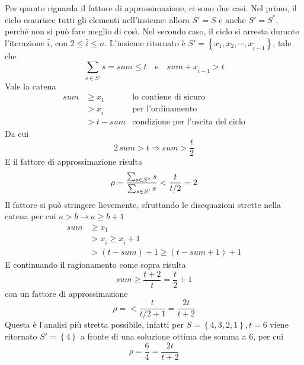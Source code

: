 Per quanto riguarda il fattore di approssimazione, ci sono due casi.
Nel primo, il ciclo esaurisce tutti gli elementi nell'insieme: allora $S' = S$ e anche $S' = S^*$, perché non si può fare meglio di così.
Nel secondo caso, il ciclo si arresta durante l'iterazione $
\bar{i}
$, con $
2 \leq \bar{i} \leq n
$. L'insieme ritornato è $
S' = \left\{ x_1, x_2, \cdots,
x_{\bar{i}-1}
\right\}
$, tale che
\begin{equation*}
    \sum_{s \in S'} s
    =
    sum
    \leq t
    \quad
    \text{e}
    \quad
    sum + 
    x_{\bar{i}-1}
    > t
\end{equation*}
Vale la catena
\begin{align*}
    sum
    &
    \geq
    x_1
    &
    \text{lo contiene di sicuro}
    \\
    &
    >
    x_{\bar{i}}
    &
    \text{per l'ordinamento}
    \\
    &
    >
    t - sum
    &
    \text{condizione per l'uscita del ciclo}
\end{align*}
Da cui
$$
2 \, sum > t
\Rightarrow
sum > \frac{t}{2}
$$
E il fattore di approssimazione risulta
\begin{equation*}
    \rho = 
    \frac{
        \sum_{s \in S^*} s
    }{
        \sum_{s \in S'} s
    }
    <
    \frac{t}{t/2}
    = 2
\end{equation*}
Il fattore si può stringere lievemente, sfruttando le disequazioni strette nella catena per cui $
a>b \to a \geq b + 1
$
\begin{align*}
    sum
    &
    \geq
    x_1
    \\
    &
    >
    x_{\bar{i}}
    \geq
    x_{\bar{i}} + 1
    \\
    &
    >
    (t - sum) + 1
    \geq 
    (t - sum + 1) + 1
\end{align*}
E continuando il ragionamento come sopra risulta 
\begin{equation*}
    sum \geq \frac{t+2}{t}
    = \frac{t}{2} + 1
\end{equation*}
con un fattore di approssimazione
\begin{equation*}
    \rho = 
    <
    \frac{t}{t/2+1}
    =
    \frac{2t}{t+2}
\end{equation*}
Questa è l'analisi più stretta possibile, infatti per $
S = \left\{ 4, 3, 2, 1 \right\}, t = 6
$ viene ritornato $
S' = \left\{ 4 \right\}
$ a fronte di una soluzione ottima che somma a 6, per cui
\begin{equation*}
    \rho = \frac{6}{4}
    = 
    \frac{2t}{t+2}
\end{equation*}

